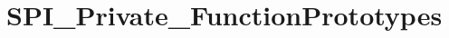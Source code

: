 \hypertarget{group___s_p_i___private___function_prototypes}{}\section{S\+P\+I\+\_\+\+Private\+\_\+\+Function\+Prototypes}
\label{group___s_p_i___private___function_prototypes}
